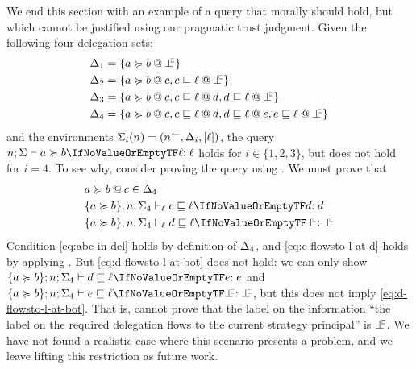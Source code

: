 We end this section with an example of a query that morally should hold, but which cannot be justified using our pragmatic trust judgment. Given the following four delegation sets:
\begin{align*}
\scope_1 &= \{ \lb{\botinfoflow}{a \actsfor b} \} \\
\scope_2 &= \{ \lb{c}{a \actsfor b}, \lb{\botinfoflow}{c \flowsto \level} \} \\
\scope_3 &= \{ \lb{c}{a \actsfor b}, \lb{d}{c \flowsto \level}, \lb{\botinfoflow}{d \flowsto \level} \} \\
\scope_4 &= \{ \lb{c}{a \actsfor b}, \lb{d}{c \flowsto \level}, \lb{e}{d \flowsto \level}, \lb{\botinfoflow}{e \flowsto \level} \}
\end{align*}
and the environments $\Sigma_i(n) = (n^{\leftarrow}, \Delta_i, \lbrack \ell \rbrack)$, the query $\actsforquery{n; \env}{a}{b}{\level}$ holds for $i \in \{1, 2, 3\}$, but does not hold for $i = 4$. To see why, consider proving the query using . We must prove that
\begin{align}
\label{eq:abc-in-del} &\lb{c}{a \actsfor b} \in \scope_4\\
\label{eq:c-flowsto-l-at-d} &\flowstoquery{\{a \actsfor b\}; n; \env_4}[\level]{c}{\level}{d}\\
\label{eq:d-flowsto-l-at-bot} &\flowstoquery{\{a \actsfor b\}; n; \env_4}[\level]{d}{\level}{\botinfoflow}
\end{align}
Condition \eqref{eq:abc-in-del} holds by definition of $\Delta_4$, and \eqref{eq:c-flowsto-l-at-d} holds by applying . But \eqref{eq:d-flowsto-l-at-bot} does not hold: we can only show $\flowstoquery{\{a \actsfor b\}; n; \env_4}{d}{\level}{e}$ and $\flowstoquery{\{a \actsfor b\}; n; \env_4}{e}{\level}{\botinfoflow}$, but this does not imply \eqref{eq:d-flowsto-l-at-bot}. That is, \lang{} cannot prove that the label on the information ``the label on the required delegation flows to the current strategy principal'' is $\botinfoflow$. We have not found a realistic case where this scenario presents a problem, and we leave lifting this restriction as future work.

